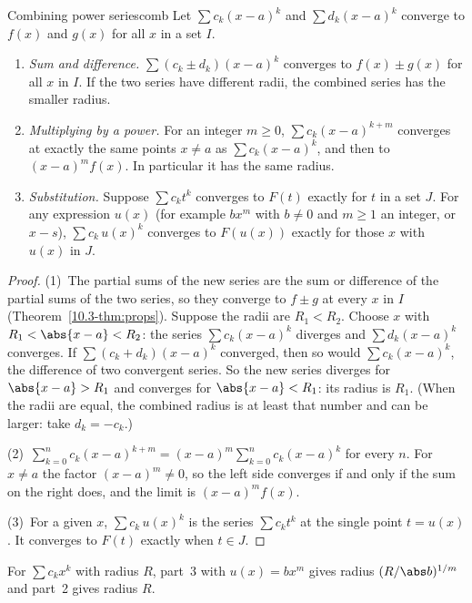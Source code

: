 \documentclass[11pt]{article}
\begin{document}
\begin{thm}{Combining power series}{comb}
Let $\sum c_k(x-a)^k$ and $\sum d_k(x-a)^k$ converge to $f(x)$ and $g(x)$ for all $x$ in a set $I$.
\begin{enumerate}
  \item \emph{Sum and difference.} $\sum(c_k\pm d_k)(x-a)^k$ converges to $f(x)\pm g(x)$ for all $x$ in $I$. If the two series have different radii, the combined series has the smaller radius.
  \item \emph{Multiplying by a power.} For an integer $m\ge0$, $\sum c_k(x-a)^{k+m}$ converges at exactly the same points $x\ne a$ as $\sum c_k(x-a)^k$, and then to $(x-a)^mf(x)$. In particular it has the same radius.
  \item \emph{Substitution.} Suppose $\sum c_kt^k$ converges to $F(t)$ exactly for $t$ in a set $J$. For any expression $u(x)$ (for example $bx^m$ with $b\ne0$ and $m\ge1$ an integer, or $x-s$), $\sum c_k\,u(x)^k$ converges to $F(u(x))$ exactly for those $x$ with $u(x)$ in $J$.
\end{enumerate}
\end{thm}
\begin{proof}
(1)~The partial sums of the new series are the sum or difference of the partial sums of the two series, so they converge to $f\pm g$ at every $x$ in $I$ (Theorem~\ref{10.3-thm:props}). Suppose the radii are $R_1<R_2$. Choose $x$ with $R_1<\abs{x-a}<R_2$: the series $\sum c_k(x-a)^k$ diverges and $\sum d_k(x-a)^k$ converges. If $\sum(c_k+d_k)(x-a)^k$ converged, then so would $\sum c_k(x-a)^k$, the difference of two convergent series. So the new series diverges for $\abs{x-a}>R_1$ and converges for $\abs{x-a}<R_1$: its radius is $R_1$. (When the radii are equal, the combined radius is at least that number and can be larger: take $d_k=-c_k$.)

(2)~$\sum_{k=0}^nc_k(x-a)^{k+m}=(x-a)^m\sum_{k=0}^nc_k(x-a)^k$ for every $n$. For $x\ne a$ the factor $(x-a)^m\ne0$, so the left side converges if and only if the sum on the right does, and the limit is $(x-a)^mf(x)$.

(3)~For a given $x$, $\sum c_k\,u(x)^k$ is the series $\sum c_kt^k$ at the single point $t=u(x)$. It converges to $F(t)$ exactly when $t\in J$.
\end{proof}

For $\sum c_kx^k$ with radius $R$, part~3 with $u(x)=bx^m$ gives radius $(R/\abs b)^{1/m}$ and part~2 gives radius $R$.
\end{document}
